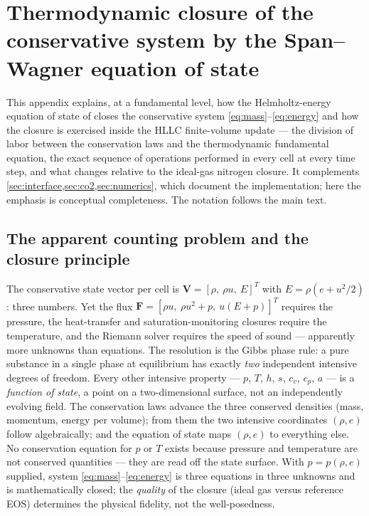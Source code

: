 \documentclass[11pt]{article}
\begin{document}
\appendix
\section{Thermodynamic closure of the conservative system by the
Span--Wagner equation of state}
\label{app:closure}

This appendix explains, at a fundamental level, how the
Helmholtz-energy equation of state of \citet{span1996} closes the
conservative system \eqref{eq:mass}--\eqref{eq:energy} and how the
closure is exercised inside the HLLC finite-volume update --- the
division of labor between the conservation laws and the thermodynamic
fundamental equation, the exact sequence of operations performed in
every cell at every time step, and what changes relative to the
ideal-gas nitrogen closure. It complements
\cref{sec:interface,sec:co2,sec:numerics}, which document the
implementation; here the emphasis is conceptual completeness. The
notation follows the main text.

\subsection{The apparent counting problem and the closure principle}
\label{app:counting}

The conservative state vector per cell is
$\mathbf{V} = [\rho,\ \rho u,\ E]^{T}$ with
$E = \rho(e + u^2/2)$: three numbers. Yet the flux
$\mathbf{F} = [\rho u,\ \rho u^2 + p,\ u(E+p)]^{T}$ requires the
pressure, the heat-transfer and saturation-monitoring closures require
the temperature, and the Riemann solver requires the speed of sound
--- apparently more unknowns than equations. The resolution is the
Gibbs phase rule: a pure substance in a single phase at equilibrium
has exactly \emph{two} independent intensive degrees of freedom. Every
other intensive property --- $p$, $T$, $h$, $s$, $c_v$, $c_p$, $a$ ---
is a \emph{function of state}, a point on a two-dimensional surface,
not an independently evolving field. The conservation laws advance the
three conserved densities (mass, momentum, energy per volume); from
them the two intensive coordinates $(\rho, e)$ follow algebraically;
and the equation of state maps $(\rho, e)$ to everything else. No
conservation equation for $p$ or $T$ exists because pressure and
temperature are not conserved quantities --- they are read off the
state surface. With $p = p(\rho, e)$ supplied, system
\eqref{eq:mass}--\eqref{eq:energy} is three equations in three
unknowns and is mathematically closed; the \emph{quality} of the
closure (ideal gas versus reference EOS) determines the physical
fidelity, not the well-posedness.
\end{document}
